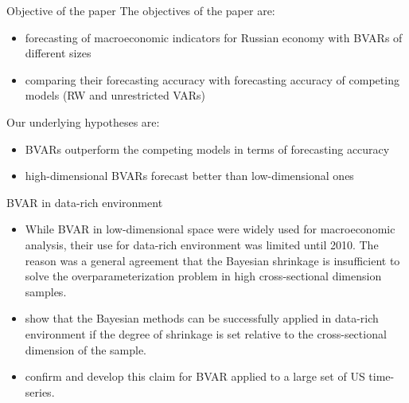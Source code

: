 \documentclass{beamer} %
\begin{document}
\begin{frame}{Objective of the paper}%
The objectives of the paper are:
\begin{itemize}
\item forecasting of macroeconomic indicators for Russian economy with BVARs of different sizes
\item comparing their forecasting accuracy with forecasting accuracy of competing  models (RW and unrestricted VARs)
\end{itemize}

Our underlying hypotheses are:
\begin{itemize}
\item BVARs outperform the competing models in terms of forecasting accuracy
\item high-dimensional BVARs forecast better than  low-dimensional ones 
\end{itemize}
\end{frame}


\begin{frame}{BVAR in data-rich environment}%
\begin{itemize}
\item While BVAR in low-dimensional space were widely used for macroeconomic analysis, their use for data-rich environment was limited until 2010. The reason was a general agreement that the Bayesian shrinkage is insufficient to solve the overparameterization problem in high cross-sectional dimension samples.
\item \cite{demol_al_2008} show that  the Bayesian methods can be successfully applied in data-rich environment if the degree of shrinkage is set relative to the cross-sectional dimension of the sample.
\item \cite{banbura_al_2010} confirm and develop this claim for BVAR applied to a large set of US time-series.
\end{itemize}
\end{frame}
  
\end{document}
